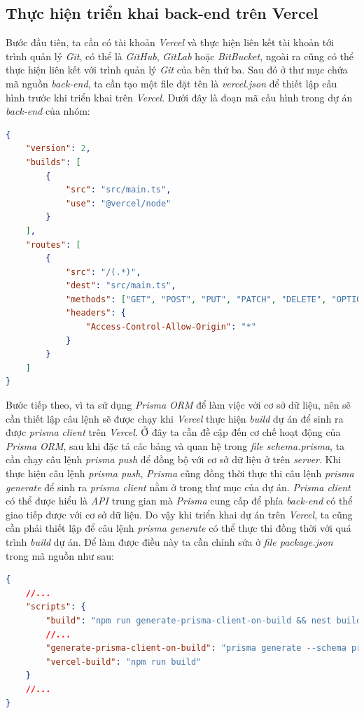 \subsection{Thực hiện triển khai back-end trên Vercel}
\hspace*{1cm}
Bước đầu tiên, ta cần có tài khoản \textit{Vercel} và thực hiện liên kết tài khoản tới trình quản lý \textit{Git}, có thể là \textit{GitHub}, \textit{GitLab} hoặc \textit{BitBucket}, ngoài ra cũng có thể thực hiện liên kết với trình quản lý \textit{Git} của bên thứ ba. Sau đó ở thư mục chứa mã nguồn \textit{back-end}, ta cần tạo một file đặt tên là \textit{vercel.json} để thiết lập cấu hình trước khi triển khai trên \textit{Vercel}. Dưới đây là đoạn mã cấu hình trong dự án \textit{back-end} của nhóm:
\begin{lstlisting}[language=json,firstnumber=1]
{
    "version": 2,
    "builds": [
        {
            "src": "src/main.ts",
            "use": "@vercel/node"
        }
    ],
    "routes": [
        {
            "src": "/(.*)",
            "dest": "src/main.ts",
            "methods": ["GET", "POST", "PUT", "PATCH", "DELETE", "OPTIONS"],
            "headers": {
                "Access-Control-Allow-Origin": "*"
            }
        }
    ]
}
\end{lstlisting}
\hspace*{1cm}
Bước tiếp theo, vì ta sử dụng \textit{Prisma ORM} để làm việc với cơ sở dữ liệu, nên sẽ cần thiết lập câu lệnh sẽ được chạy khi \textit{Vercel} thực hiện \textit{build} dự án để sinh ra được \textit{prisma client} trên \textit{Vercel}. Ở đây ta cần đề cập đến cơ chế hoạt động của \textit{Prisma ORM}, sau khi đặc tả các bảng và quan hệ trong \textit{file schema.prisma}, ta cần chạy câu lệnh \textit{prisma push} để đồng bộ với cơ sở dữ liệu ở trên \textit{server}. Khi thực hiện câu lệnh \textit{prisma push}, \textit{Prisma} cũng đồng thời thực thi câu lệnh \textit{prisma generate} để sinh ra \textit{prisma client} nằm ở trong thư mục của dự án. \textit{Prisma client} có thể được hiểu là \textit{API} trung gian mà \textit{Prisma} cung cấp để phía \textit{back-end} có thể giao tiếp được với cơ sở dữ liệu. Do vậy khi triển khai dự án trên \textit{Vercel}, ta cũng cần phải thiết lập để câu lệnh \textit{prisma generate} có thể thực thi đồng thời với quá trình \textit{build} dự án. Để làm được điều này ta cần chỉnh sửa ở \textit{file package.json} trong mã nguồn như sau:
\begin{lstlisting}[language=json,firstnumber=1]
{
    //...
    "scripts": {
        "build": "npm run generate-prisma-client-on-build && nest build",
        //...
        "generate-prisma-client-on-build": "prisma generate --schema prisma/schema.prisma",
        "vercel-build": "npm run build"
    }
    //...
}
\end{lstlisting}
